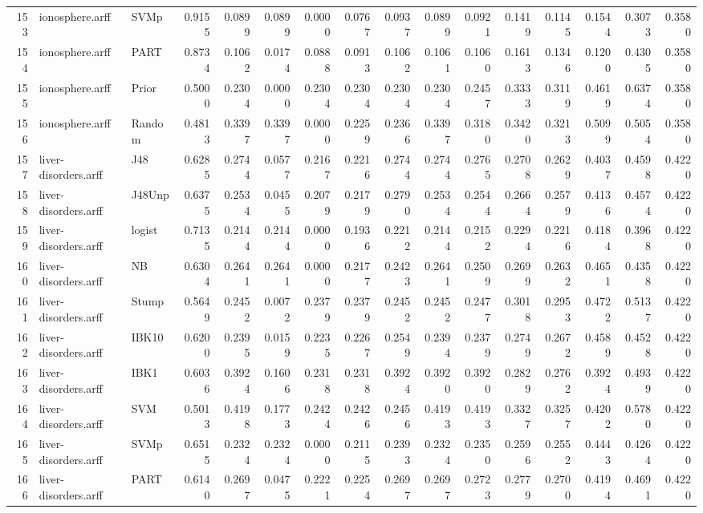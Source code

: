 \documentclass {article}
\begin{document}
\begin{table}[ht]
\begin{tabular}{rllrrrrrrrrrrrrr}
  153 & ionosphere.arff & SVMp & 0.9155 & 0.0899 & 0.0899 & 0.0000 & 0.0767 & 0.0937 & 0.0899 & 0.0921 & 0.1419 & 0.1145 & 0.1544 & 0.3073 & 0.3580 \\ 
  154 & ionosphere.arff & PART & 0.8734 & 0.1062 & 0.0174 & 0.0888 & 0.0913 & 0.1062 & 0.1061 & 0.1060 & 0.1613 & 0.1346 & 0.1200 & 0.4305 & 0.3580 \\ 
  155 & ionosphere.arff & Prior & 0.5000 & 0.2304 & 0.0000 & 0.2304 & 0.2304 & 0.2304 & 0.2304 & 0.2457 & 0.3333 & 0.3119 & 0.4619 & 0.6374 & 0.3580 \\ 
  156 & ionosphere.arff & Random & 0.4813 & 0.3397 & 0.3397 & 0.0000 & 0.2259 & 0.2366 & 0.3397 & 0.3180 & 0.3420 & 0.3213 & 0.5099 & 0.5054 & 0.3580 \\ 
  157 & liver-disorders.arff & J48 & 0.6285 & 0.2744 & 0.0577 & 0.2167 & 0.2216 & 0.2744 & 0.2744 & 0.2765 & 0.2708 & 0.2629 & 0.4037 & 0.4598 & 0.4220 \\ 
  158 & liver-disorders.arff & J48Unp & 0.6375 & 0.2534 & 0.0455 & 0.2079 & 0.2179 & 0.2790 & 0.2534 & 0.2544 & 0.2664 & 0.2579 & 0.4136 & 0.4574 & 0.4220 \\ 
  159 & liver-disorders.arff & logist & 0.7135 & 0.2144 & 0.2144 & 0.0000 & 0.1936 & 0.2212 & 0.2144 & 0.2152 & 0.2294 & 0.2216 & 0.4184 & 0.3968 & 0.4220 \\ 
  160 & liver-disorders.arff & NB & 0.6304 & 0.2641 & 0.2641 & 0.0000 & 0.2177 & 0.2423 & 0.2641 & 0.2509 & 0.2699 & 0.2632 & 0.4651 & 0.4358 & 0.4220 \\ 
  161 & liver-disorders.arff & Stump & 0.5649 & 0.2452 & 0.0072 & 0.2379 & 0.2379 & 0.2452 & 0.2452 & 0.2477 & 0.3018 & 0.2953 & 0.4722 & 0.5137 & 0.4220 \\ 
  162 & liver-disorders.arff & IBK10 & 0.6200 & 0.2395 & 0.0159 & 0.2235 & 0.2267 & 0.2549 & 0.2394 & 0.2379 & 0.2749 & 0.2672 & 0.4589 & 0.4528 & 0.4220 \\ 
  163 & liver-disorders.arff & IBK1 & 0.6036 & 0.3924 & 0.1606 & 0.2318 & 0.2318 & 0.3924 & 0.3920 & 0.3920 & 0.2829 & 0.2762 & 0.3924 & 0.4939 & 0.4220 \\ 
  164 & liver-disorders.arff & SVM & 0.5013 & 0.4198 & 0.1773 & 0.2424 & 0.2426 & 0.2456 & 0.4193 & 0.4193 & 0.3327 & 0.3257 & 0.4202 & 0.5780 & 0.4220 \\ 
  165 & liver-disorders.arff & SVMp & 0.6515 & 0.2324 & 0.2324 & 0.0000 & 0.2115 & 0.2393 & 0.2324 & 0.2350 & 0.2596 & 0.2552 & 0.4443 & 0.4264 & 0.4220 \\ 
  166 & liver-disorders.arff & PART & 0.6140 & 0.2697 & 0.0475 & 0.2221 & 0.2254 & 0.2697 & 0.2697 & 0.2723 & 0.2779 & 0.2700 & 0.4194 & 0.4691 & 0.4220 \\ 

\end{tabular}
\end{table}
\end{document}
